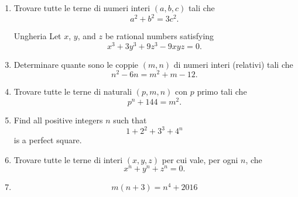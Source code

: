 \documentclass[a4paper]{article}
\newcommand{\Intitola}{\begin{center}
		\vspace*{0,5 cm}
		{\Huge \textsc{\Title}} \\
		\vspace{0,5 cm}
		\textsc{\Author} \hspace{1cm} \textsc{\Date}
		\thispagestyle{empty}
		\vspace{0,7 cm}
\end{center}}
\theoremstyle{remark}
\theoremstyle{definition}
\begin{document}
\begin{enumerate}
	\item  Trovare tutte le terne di numeri interi $ (a, b, c) $ tali che
	\[ a^2 + b^2 = 3c^2. \]
	
	
	\item  [Ungheria] Let $ x $, $ y $, and $ z $ be rational numbers satisfying
	\[x^3 + 3y^3 + 9z^3 - 9xyz = 0.\]
	
	
	
	\item  Determinare quante sono le coppie $ (m, n) $ di numeri interi (relativi) tali che
	\[n^2 - 6n = m^2 + m - 12.\]
	
	
	\item  Trovare tutte le terne di naturali $ (p, m, n) $ con $ p $ primo tali che
	\[ p^n +144 = m^2. \]
	
	
	
	\item  Find all positive integers $ n $ such that $$  1 + 2^2 + 3^3 + 4^n  $$ is a perfect square.\\
	
	\item  Trovare tutte le terne di interi $ (x, y, z) $ per cui vale, per ogni $ n $, che \[ x^n + y^n + z^n = 0. \]
	
	\item  \[ m(n+3) = n^4 + 2016 \]
	
	
	
\end{enumerate}

\Intitola
\normalsize
\end{document}
